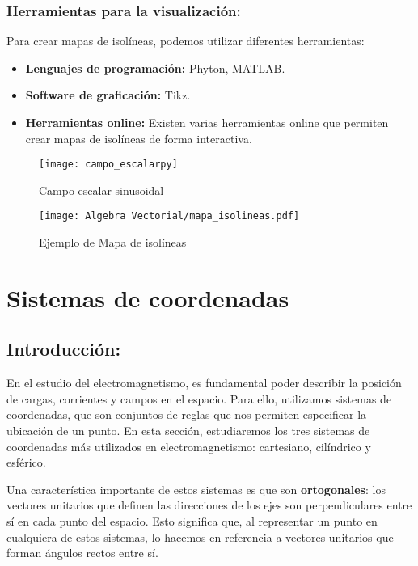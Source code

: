 \documentclass{book}
\begin{document}
\subsubsection{Herramientas para la visualización:}

Para crear mapas de isolíneas, podemos utilizar diferentes herramientas:

\begin{itemize}
\item[\textbullet] \textbf{Lenguajes de programación:} Phyton, MATLAB.
\item[\textbullet] \textbf{Software de graficación:} Tikz.
\item[\textbullet] \textbf{Herramientas online:} Existen varias herramientas online que permiten crear mapas de isolíneas de forma interactiva.
\end{itemize}
\begin{figure} [h!]
    \centering
    \texttt{[image: campo\_escalarpy]}
    \caption{Campo escalar sinusoidal}
    \label{fig:campo_escalar}
\end{figure}


\begin{figure} [h!]
    \centering
    \texttt{[image: Algebra Vectorial/mapa\_isolineas.pdf]}
    \caption{Ejemplo de Mapa de isolíneas}
    \label{mapa_isolineas}
\end{figure}

\newpage
\section{Sistemas de coordenadas}

\subsection{Introducción:}

En el estudio del electromagnetismo, es fundamental poder describir la posición de cargas, corrientes y campos en el espacio. Para ello, utilizamos sistemas de coordenadas, que son conjuntos de reglas que nos permiten especificar la ubicación de un punto. En esta sección, estudiaremos los tres sistemas de coordenadas más utilizados en electromagnetismo: cartesiano, cilíndrico y esférico.

Una característica importante de estos sistemas es que son \textbf{ortogonales}: los vectores unitarios que definen las direcciones de los ejes son perpendiculares entre sí en cada punto del espacio. Esto significa que, al representar un punto en cualquiera de estos sistemas, lo hacemos en referencia a vectores unitarios que forman ángulos rectos entre sí. 
\end{document}
